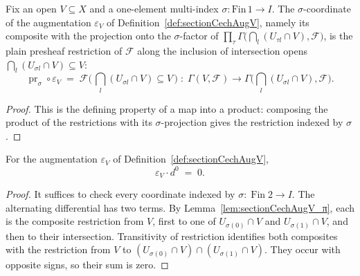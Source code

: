 \begin{lemma}
  \label{lem:sectionCechAugV_π}
  \leanok
  Fix an open \(V \subseteq X\) and a one-element multi-index \(\sigma : \mathrm{Fin}\,1 \to I\).
  The \(\sigma\)-coordinate of the augmentation \(\varepsilon_V\) of
  Definition~\ref{def:sectionCechAugV}, namely its composite with the projection onto the
  \(\sigma\)-factor of
  \(\prod_\tau \Gamma\bigl(\bigcap_l(U_{\tau l}\cap V),\mathcal{F}\bigr)\), is the plain presheaf
  restriction of \(\mathcal{F}\) along the inclusion of intersection opens
  \(\bigcap_l(U_{\sigma l}\cap V) \subseteq V\):
  \[
    \operatorname{pr}_{\sigma}\circ\varepsilon_V
      \;=\;
    \mathcal{F}\bigl(\,\textstyle\bigcap_l(U_{\sigma l}\cap V)\subseteq V\,\bigr)
      \;:\; \Gamma(V,\mathcal{F}) \longrightarrow
      \Gamma\bigl(\textstyle\bigcap_l(U_{\sigma l}\cap V),\mathcal{F}\bigr).
  \]
\end{lemma}
\begin{proof}
  \leanok
  This is the defining property of a map into a product: composing the product of the
  restrictions with its \(\sigma\)-projection gives the restriction indexed by \(\sigma\).
\end{proof}

\begin{lemma}\leanok
  \label{lem:sectionCechAugV_comp_d}
  For the augmentation \(\varepsilon_V\) of Definition~\ref{def:sectionCechAugV},
  \[
    \varepsilon_V \cdot d^0 \;=\; 0.
  \]
\end{lemma}
\begin{proof}
  \leanok
  It suffices to check every coordinate indexed by \(\sigma:\operatorname{Fin}2\to I\).
  The alternating differential has two terms. By
  Lemma~\ref{lem:sectionCechAugV_π}, each is the composite restriction from \(V\), first to one
  of \(U_{\sigma(0)}\cap V\) and \(U_{\sigma(1)}\cap V\), and then to their intersection.
  Transitivity of restriction identifies both composites with the restriction from \(V\) to
  \((U_{\sigma(0)}\cap V)\cap(U_{\sigma(1)}\cap V)\). They occur with opposite signs, so their
  sum is zero.
\end{proof}

